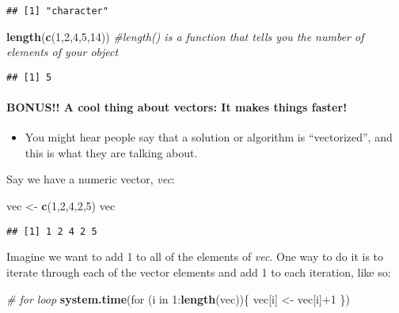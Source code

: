 \documentclass[]{article}
\newenvironment{Shaded}{\begin{snugshade}}{\end{snugshade}}
\newcommand{\KeywordTok}[1]{\textcolor[rgb]{0.13,0.29,0.53}{\textbf{{#1}}}}
\newcommand{\DecValTok}[1]{\textcolor[rgb]{0.00,0.00,0.81}{{#1}}}
\newcommand{\StringTok}[1]{\textcolor[rgb]{0.31,0.60,0.02}{{#1}}}
\newcommand{\CommentTok}[1]{\textcolor[rgb]{0.56,0.35,0.01}{\textit{{#1}}}}
\newcommand{\NormalTok}[1]{{#1}}
\providecommand{\tightlist}{%
  \setlength{\itemsep}{0pt}\setlength{\parskip}{0pt}}
\let\oldparagraph\paragraph
\renewcommand{\paragraph}[1]{\oldparagraph{#1}\mbox{}}
\begin{document}
\begin{verbatim}
## [1] "character"
\end{verbatim}

\begin{Shaded}
\begin{Highlighting}[]
\KeywordTok{length}\NormalTok{(}\KeywordTok{c}\NormalTok{(}\DecValTok{1}\NormalTok{,}\DecValTok{2}\NormalTok{,}\DecValTok{4}\NormalTok{,}\DecValTok{5}\NormalTok{,}\DecValTok{14}\NormalTok{)) }\CommentTok{#length() is a function that tells you the number of elements of your object}
\end{Highlighting}
\end{Shaded}

\begin{verbatim}
## [1] 5
\end{verbatim}

\paragraph{BONUS!! A cool thing about vectors: It makes things
faster!}\label{bonus-a-cool-thing-about-vectors-it-makes-things-faster}

\begin{itemize}
\tightlist
\item
  You might hear people say that a solution or algorithm is
  ``vectorized'', and this is what they are talking about.
\end{itemize}

Say we have a numeric vector, \emph{vec}:

\begin{Shaded}
\begin{Highlighting}[]
\NormalTok{vec <-}\StringTok{ }\KeywordTok{c}\NormalTok{(}\DecValTok{1}\NormalTok{,}\DecValTok{2}\NormalTok{,}\DecValTok{4}\NormalTok{,}\DecValTok{2}\NormalTok{,}\DecValTok{5}\NormalTok{)}
\NormalTok{vec}
\end{Highlighting}
\end{Shaded}

\begin{verbatim}
## [1] 1 2 4 2 5
\end{verbatim}

Imagine we want to add 1 to all of the elements of \emph{vec}. One way
to do it is to iterate through each of the vector elements and add 1 to
each iteration, like so:

\begin{Shaded}
\begin{Highlighting}[]
\CommentTok{# for loop}
\KeywordTok{system.time}\NormalTok{(for (i in }\DecValTok{1}\NormalTok{:}\KeywordTok{length}\NormalTok{(vec))\{}
  \NormalTok{vec[i] <-}\StringTok{ }\NormalTok{vec[i]+}\DecValTok{1}
  \NormalTok{\})}
\end{Highlighting}
\end{Shaded}
\end{document}
